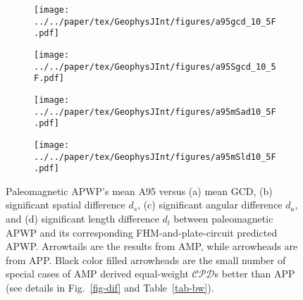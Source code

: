 \begin{figure}[!ht]
  \captionsetup[subfigure]{singlelinecheck=off,justification=raggedright,aboveskip=-6pt,belowskip=-6pt}
  \centering
  \begin{subfigure}[htbp]{.49\textwidth}
    \caption{}\texttt{[image: ../../paper/tex/GeophysJInt/figures/a95gcd\_10\_5F.pdf]}\label{fig-A95GCD105F}
  \end{subfigure}
  \begin{subfigure}[htbp]{.49\textwidth}
    \caption{}\texttt{[image: ../../paper/tex/GeophysJInt/figures/a95Sgcd\_10\_5F.pdf]}\label{fig-A95SGCD105F}
  \end{subfigure}
  \begin{subfigure}[htbp]{.49\textwidth}
    \caption{}\texttt{[image: ../../paper/tex/GeophysJInt/figures/a95mSad10\_5F.pdf]}\label{fig-A95mSad105F}
  \end{subfigure}
  \begin{subfigure}[htbp]{.49\textwidth}
    \caption{}\texttt{[image: ../../paper/tex/GeophysJInt/figures/a95mSld10\_5F.pdf]}\label{fig-A95mSld105F}
  \end{subfigure}
  \caption[APP spatially better than AMP (arrow)]{Paleomagnetic APWP's mean A95
    versus (a) mean GCD, (b) significant spatial difference $d_s$, (c)
    significant angular difference $d_a$, and (d) significant length difference
    $d_l$ between paleomagnetic APWP and its corresponding FHM-and-plate-circuit
    predicted APWP\@. Arrowtails are the results from AMP, while arrowheads are
    from APP\@. Black color filled arrowheads are the small number of special
    cases of AMP derived equal-weight $\mathcal{CPD}$s better than APP (see
    details in Fig.~\ref{fig-dif} and Table~\ref{tab-bw}).}\label{fig-A95mG105F}
\end{figure}

